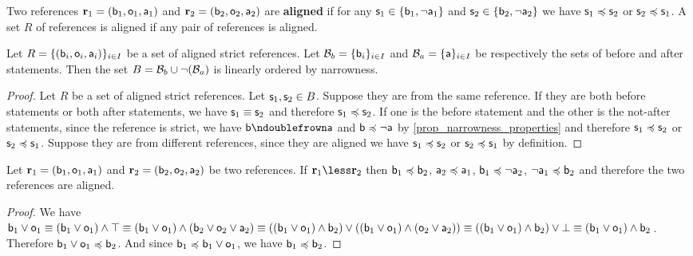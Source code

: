 \documentclass[11pt,letterpaper,fleqn]{memoir} %
\begin{document}
\begin{mathSection}
\begin{defn}
	Two references $\refStmt_1 = (\stmt[b]_1, \stmt[o]_1, \stmt[a]_1)$ and $\refStmt_2 = (\stmt[b]_2, \stmt[o]_2, \stmt[a]_2)$ are \textbf{aligned} if for any $\stmt_1 \in \{ \stmt[b]_1, \NOT\stmt[a]_1\}$ and $\stmt_2 \in \{ \stmt[b]_2, \NOT\stmt[a]_2\}$ we have 
	$\stmt_1 \narrower \stmt_2$ or $\stmt_2 \narrower \stmt_1$. A set $R$ of references is aligned if any pair of references is aligned.
\end{defn}
\begin{prop}\label{3_prop_strict_alignment_is_ordering}
	Let $R = \{(\stmt[b]_i, \stmt[o]_i, \stmt[a]_i)\}_{i\in I}$ be a set of aligned strict references. Let $\basis_b = \{\stmt[b]_i\}_{i\in I}$ and $\basis_a = \{\stmt[a]\}_{i\in I}$ be respectively the sets of before and after statements. Then the set $B = \basis_b \cup \NOT (\basis_a)$ is linearly ordered by narrowness.
\end{prop}
\begin{proof}
	Let $R$ be a set of aligned strict references. Let $\stmt_1, \stmt_2 \in B$. Suppose they are from the same reference. If they are both before statements or both after statements, we have $\stmt_1 \equiv \stmt_2$ and therefore $\stmt_1 \narrower \stmt_2$. If one is the before statement and the other is the not-after statements, since the reference is strict, we have $\stmt[b] \ncomp \stmt[a]$ and $\stmt[b] \narrower \NOT\stmt[a]$ by \ref{prop_narrowness_properties} and therefore $\stmt_1 \narrower \stmt_2$ or $\stmt_2 \narrower \stmt_1$. Suppose they are from different references, since they are aligned we have  $\stmt_1 \narrower \stmt_2$ or $\stmt_2 \narrower \stmt_1$ by definition.
\end{proof}

\begin{prop}\label{3_prop_ordered_references_are_aligned}
	Let $\refStmt_1 = ( \stmt[b]_1, \stmt[o]_1, \stmt[a]_1 )$ and $\refStmt_2 = ( \stmt[b]_2, \stmt[o]_2, \stmt[a]_2 )$ be two references. If $\refStmt_1 \less \refStmt_2$ then $\stmt[b]_1 \narrower \stmt[b]_2$, $\stmt[a]_2 \narrower \stmt[a]_1$, $\stmt[b]_1 \narrower \NOT \stmt[a]_2$, $\NOT \stmt[a]_1 \narrower \stmt[b]_2$ and therefore the two references are aligned.
\end{prop}
\begin{proof}
	We have $\stmt[b]_1 \OR \stmt[o]_1 \equiv (\stmt[b]_1 \OR \stmt[o]_1) \AND \tautology \equiv (\stmt[b]_1 \OR \stmt[o]_1) \AND (\stmt[b]_2 \OR \stmt[o]_2 \OR \stmt[a]_2) \equiv ((\stmt[b]_1 \OR \stmt[o]_1) \AND \stmt[b]_2) \OR ((\stmt[b]_1 \OR \stmt[o]_1) \AND (\stmt[o]_2 \OR \stmt[a]_2)) \equiv ((\stmt[b]_1 \OR \stmt[o]_1) \AND \stmt[b]_2) \OR \contradiction \equiv (\stmt[b]_1 \OR \stmt[o]_1) \AND \stmt[b]_2$. Therefore $\stmt[b]_1 \OR \stmt[o]_1 \narrower \stmt[b]_2$. And since $\stmt[b]_1 \narrower \stmt[b]_1 \OR \stmt[o]_1$, we have $\stmt[b]_1 \narrower \stmt[b]_2$.
	

\end{proof}
\end{mathSection}
\end{document}
